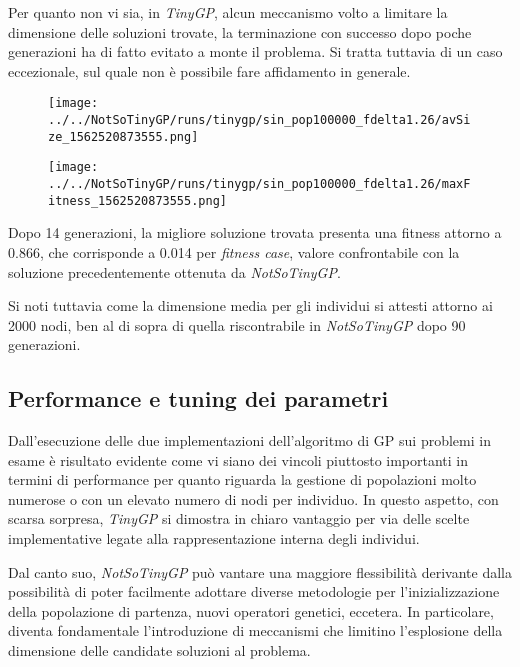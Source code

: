 \documentclass{../llncs}
\newcommand{\labelfig}[1]{\label{fig:#1}}
\begin{document}
Per quanto non vi sia, in \emph{TinyGP}, alcun meccanismo volto a limitare la dimensione delle soluzioni trovate, la terminazione con successo dopo poche generazioni ha di fatto evitato a monte il problema. Si tratta tuttavia di un caso eccezionale, sul quale non è possibile fare affidamento in generale.\\

\begin{figure}[!htb]
\centering
\texttt{[image: ../../NotSoTinyGP/runs/tinygp/sin\_pop100000\_fdelta1.26/avSize\_1562520873555.png]}
\end{figure}

\begin{figure}[!htb]
\centering
\texttt{[image: ../../NotSoTinyGP/runs/tinygp/sin\_pop100000\_fdelta1.26/maxFitness\_1562520873555.png]}
\end{figure}

Dopo 14 generazioni, la migliore soluzione trovata presenta una fitness attorno a 0.866, che corrisponde a 0.014 per \emph{fitness case}, valore confrontabile con la soluzione precedentemente ottenuta da \emph{NotSoTinyGP}.

Si noti tuttavia come la dimensione media per gli individui si attesti attorno ai 2000 nodi, ben al di sopra di quella riscontrabile in \emph{NotSoTinyGP} dopo 90 generazioni.

\subsection{Performance e tuning dei parametri}
Dall'esecuzione delle due implementazioni dell'algoritmo di GP sui problemi in esame è risultato evidente come vi siano dei vincoli piuttosto importanti in termini di performance per quanto riguarda la gestione di popolazioni molto numerose o con un elevato numero di nodi per individuo. In questo aspetto, con scarsa sorpresa, \emph{TinyGP} si dimostra in chiaro vantaggio per via delle scelte implementative legate alla rappresentazione interna degli individui.

Dal canto suo, \emph{NotSoTinyGP} può vantare una maggiore flessibilità derivante dalla possibilità di poter facilmente adottare diverse metodologie per l'inizializzazione della popolazione di partenza, nuovi operatori genetici, eccetera. In particolare, diventa fondamentale l'introduzione di meccanismi che limitino l'esplosione della dimensione delle candidate soluzioni al problema.\\
\end{document}
